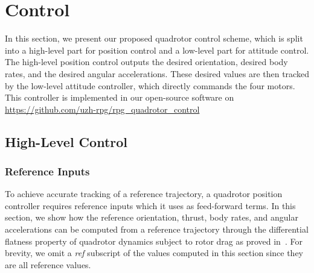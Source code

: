 \documentclass[10pt,a4paper,fleqn]{article}
\begin{document}
\section{Control} \label{sec:control}

In this section, we present our proposed quadrotor control scheme, which is split into a high-level part for position control and a low-level part for attitude control.
The high-level position control outputs the desired orientation, desired body rates, and the desired angular accelerations.
These desired values are then tracked by the low-level attitude controller, which directly commands the four motors.
This controller is implemented in our open-source software on \href{https://github.com/uzh-rpg/rpg_quadrotor_control}{https://github.com/uzh-rpg/rpg\_quadrotor\_control}

\subsection{High-Level Control}

\subsubsection{Reference Inputs}

To achieve accurate tracking of a reference trajectory, a quadrotor position controller requires reference inputs which it uses as feed-forward terms.
In this section, we show how the reference orientation, thrust, body rates, and angular accelerations can be computed from a reference trajectory through the differential flatness property of quadrotor dynamics subject to rotor drag as proved in~\cite{Faessler18ral}.
For brevity, we omit a \emph{ref} subscript of the values computed in this section since they are all reference values.
\end{document}

